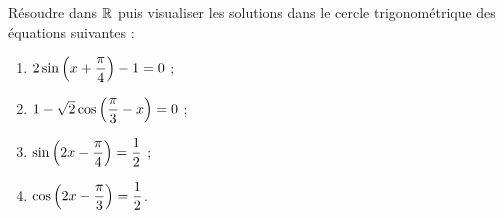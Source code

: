 \documentclass[a4paper,11pt]{article}
\begin{document}
\medskip


\medskip

Résoudre dans $\R$ puis visualiser les solutions dans le cercle trigonométrique des équations suivantes :
\begin{enumerate}
	\item $2\sin \left(x+\dfrac{\pi}{4}\right)-1 = 0$ ;
	\item $1-\sqrt{2} \cos \left(\dfrac{\pi}{3} - x \right) = 0$ ;
	\item $\sin \left(2x - \dfrac{\pi}{4} \right) = \dfrac12$ ;
	\item $\cos \left(2x -\dfrac{\pi}{3} \right) = \dfrac12$.
\end{enumerate}
\end{document}
